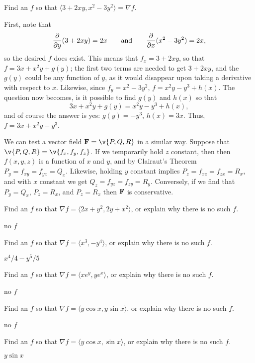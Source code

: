 \begin{theorem}
\begin{example} Find an $f$ so that $\langle 3+2xy,x^2-3y^2\rangle = \nabla f$.

First, note that 
$${\partial\over\partial y}(3+2xy)=2x\qquad\hbox{and}\qquad
{\partial\over\partial x}(x^2-3y^2)=2x,$$
so the desired $f$ does exist. This means that $f_x=3+2xy$, so that
$f=3x+x^2y+g(y)$; the first two terms are needed to get $3+2xy$, and
the $g(y)$ could be any function of $y$, as it would disappear upon
taking a derivative with respect to $x$. Likewise, since
$f_y=x^2-3y^2$, $f=x^2y-y^3+h(x)$. The question now becomes, is it
possible to find $g(y)$ and $h(x)$ so that
$$3x+x^2y+g(y)=x^2y-y^3+h(x),$$
and of course the answer is yes: $g(y)=-y^3$, $h(x)=3x$. Thus,
$f=3x+x^2y-y^3$.
\end{example}

We can test a vector field ${\bf F}=\v{P,Q,R}$ in a similar
way. Suppose that $\v{P,Q,R}=\v{f_x,f_y,f_z}$. If we temporarily hold
$z$ constant, then then $f(x,y,z)$ is a function of $x$ and $y$, and
by Clairaut's Theorem $P_y=f_{xy}=f_{yx}=Q_x$.
Likewise, holding $y$ constant implies $P_z=f_{xz}=f_{zx}=R_x$, and
with $x$ constant we get $Q_z=f_{yz}=f_{zy}=R_y$. Conversely, if we
find that $P_y=Q_x$, $P_z=R_x$, and $P_z=R_x$ then $\bf F$ is
conservative.

\begin{exercises}


\exercise Find an $f$ so that $\nabla f=\langle 2x+y^2,2y+x^2\rangle$, or
explain why there is no such $f$.
\begin{answer} no $f$
\end{answer}

\exercise Find an $f$ so that $\nabla f=\langle x^3,-y^4\rangle$, 
or explain why there is no such $f$.
\begin{answer} $x^4/4-y^5/5$
\end{answer}

\exercise Find an $f$ so that $\nabla f=\langle xe^y,ye^x \rangle$, 
or explain why there is no such $f$.
\begin{answer}  no $f$
\end{answer}

\exercise Find an $f$ so that $\nabla f=\langle y\cos x,y\sin x \rangle$, 
or explain why there is no such $f$.
\begin{answer}  no $f$
\end{answer}

\exercise Find an $f$ so that $\nabla f=\langle y\cos x,\sin x\rangle$, 
or explain why there is no such $f$.
\begin{answer} $y\sin x$
\end{answer}


\end{exercises}
\end{theorem}
